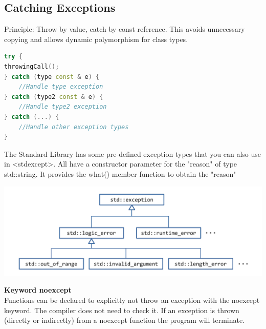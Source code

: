 \subsection{Catching Exceptions}
Principle: Throw by value, catch by const reference. This avoids unnecessary copying and allows dynamic polymorphism for class types.
\begin{lstlisting}[language=C++]
try {
throwingCall(); 
} catch (type const & e) {
	//Handle type exception 
} catch (type2 const & e) {
	//Handle type2 exception 
} catch (...) {
	//Handle other exception types 
}
\end{lstlisting}
The Standard Library has some pre-defined exception types that you can also use in <stdexcept>. All have a constructor parameter for the "reason" of type std::string. It provides the what() member function to obtain the "reason"
\begin{center}
	\includegraphics[width=0.75\linewidth]{images/exceptions}
\end{center}

\textbf{Keyword noexcept} \\
Functions can be declared to explicitly not throw an exception with the noexcept keyword. The compiler does not need to check it.  If an exception is thrown (directly or indirectly) from a noexcept function the program will terminate.

\break